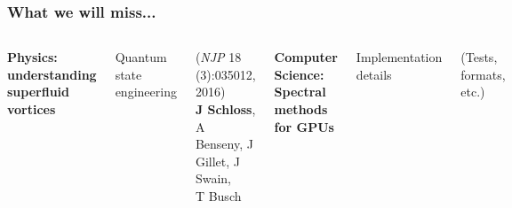 \documentclass{beamer}
\begin{document}
\begin{frame}
\frametitle{What we will miss...}

\begin{columns}
\center
\textbf{Physics: understanding superfluid vortices}

\vspace{0.5cm}
Quantum state engineering

{\scriptsize (\textit{NJP} 18 (3):035012, 2016)} \\
{\scriptsize \textbf{J Schloss}, A Benseny, J Gillet, J Swain, \\ T Busch} \\

\center

\textbf{Computer Science: Spectral methods for GPUs}

\vspace{0.5cm}

Implementation details

{\scriptsize (Tests, formats, etc.)}
\vspace{0.7cm}

\end{columns}

\end{frame}
\end{document}
